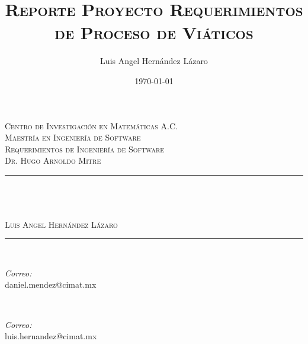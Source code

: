 \documentclass{report}
\title{\textsc{Reporte Proyecto Requerimientos de Proceso de Viáticos}}
\author{Luis Angel Hernández Lázaro \\ }
\date{\today}
\makeatletter
\let\thetitle\@title
\makeatother
\begin{document}

\begin{titlepage}
	\centering
    \vspace*{0.5 cm}
    
    
    \begin{figure}
		\centering
	\end{figure}
    \textsc{\LARGE Centro de Investigación en Matemáticas A.C.}\\[1.0 cm]
	\textsc{\Large Maestría en Ingeniería de Software}\\[0.5 cm]
	\textsc{\large Requerimientos de Ingeniería de Software\\Dr. Hugo Arnoldo Mitre}\\[0.5 cm]
	\rule{\linewidth}{0.2 mm} \\[0.4 cm]
	{ \huge \bfseries \thetitle}\\ \textsc{\large \\ Luis Angel Hernández Lázaro}
	\rule{\linewidth}{0.2 mm} \\[1.5 cm]
	
	\begin{minipage}{0.5\textwidth}
		\begin{flushleft} \large
			\emph{Correo:}\\
			daniel.mendez@cimat.mx
		\end{flushleft}
	\end{minipage}~
	\begin{minipage}{0.4\textwidth}
		\begin{flushright} \large
			\emph{Correo:} \\
			luis.hernandez@cimat.mx
		\end{flushright}
	\end{minipage}\\[2 cm]
		

\end{titlepage}
\end{document}
